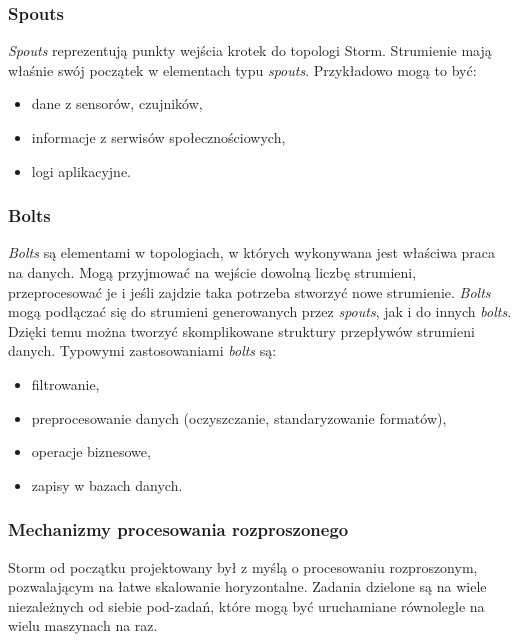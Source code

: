 \subsubsection*{Spouts}
\textit{Spouts} reprezentują punkty wejścia krotek do topologi Storm.
Strumienie mają właśnie swój początek w elementach typu \textit{spouts}.
Przykładowo mogą to być:
\begin{itemize}
  \item dane z sensorów, czujników,
  \item informacje z serwisów społecznościowych,
  \item logi aplikacyjne.
\end{itemize}
\subsubsection*{Bolts}
\textit{Bolts} są elementami w topologiach,
w których wykonywana jest właściwa praca na danych.
Mogą przyjmować na wejście dowolną liczbę strumieni,
przeprocesować je
i jeśli zajdzie taka potrzeba stworzyć nowe strumienie.
\textit{Bolts} mogą podłączać się do strumieni generowanych przez \textit{spouts},
jak i do innych \textit{bolts}.
Dzięki temu można tworzyć skomplikowane struktury przepływów strumieni danych.
Typowymi zastosowaniami \textit{bolts} są:
\begin{itemize}
  \item filtrowanie,
  \item preprocesowanie danych (oczyszczanie, standaryzowanie formatów),
  \item operacje biznesowe,
  \item zapisy w bazach danych.
\end{itemize}

\subsubsection*{Mechanizmy procesowania rozproszonego}
Storm od początku projektowany był z myślą o procesowaniu rozproszonym,
pozwalającym na łatwe skalowanie horyzontalne.
Zadania dzielone są na wiele niezależnych od siebie pod-zadań,
które mogą być uruchamiane równolegle na wielu maszynach na raz.

